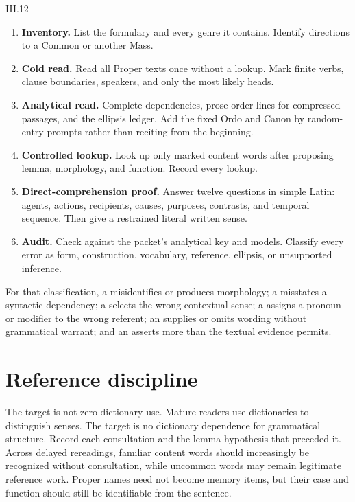 \begin{courseunit}{III.12}
\begin{enumerate}
  \item \textbf{Inventory.} List the formulary and every genre it
    contains. Identify directions to a Common or another Mass.
  \item \textbf{Cold read.} Read all Proper texts once without a lookup. Mark
    finite verbs, clause boundaries, speakers, and only the most likely heads.
  \item \textbf{Analytical read.} Complete dependencies, prose-order lines for
    compressed passages, and the ellipsis ledger. Add the fixed Ordo and Canon
    by random-entry prompts rather than reciting from the beginning.
  \item \textbf{Controlled lookup.} Look up only marked content words after
    proposing lemma, morphology, and function. Record every lookup.
  \item \textbf{Direct-comprehension proof.} Answer twelve questions in simple
    Latin: agents, actions, recipients, causes, purposes, contrasts, and temporal
    sequence. Then give a restrained literal written sense.
  \item \textbf{Audit.} Check against the packet's analytical key and models.
    Classify every error as form, construction, vocabulary, reference, ellipsis,
    or unsupported inference.
\end{enumerate}

For that classification, a  misidentifies or produces
morphology; a  misstates a syntactic dependency; a
 selects the wrong contextual sense; a  assigns a pronoun or modifier to the wrong referent; an  supplies or omits wording without grammatical warrant; and an
 asserts more than the textual evidence permits.

\section{Reference discipline}

The target is not zero dictionary use. Mature readers use dictionaries to
distinguish senses. The target is no dictionary dependence for grammatical
structure. Record each consultation and the lemma hypothesis that preceded it.
Across delayed rereadings, familiar content words should increasingly be
recognized without consultation, while uncommon words may remain legitimate
reference work. Proper names need not become memory items, but their case and
function should still be identifiable from the sentence.


\end{courseunit}
